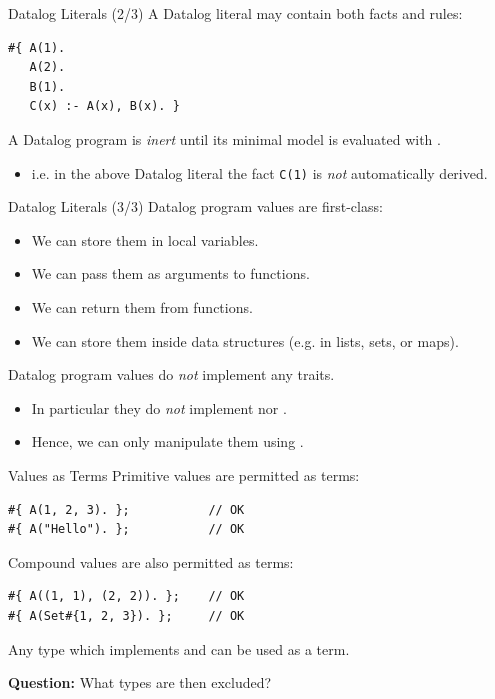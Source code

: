 \begin{frame}[fragile]{Datalog Literals (2/3)}
A Datalog literal may contain both facts and rules:

\begin{lstlisting}[language=flix, xleftmargin=0.8cm]
#{ A(1). 
   A(2). 
   B(1).
   C(x) :- A(x), B(x). }
\end{lstlisting}

A Datalog program is \emph{inert} until its minimal model is evaluated with
. 

\begin{itemize}
    \item i.e. in the above Datalog literal the fact \lstinline{C(1)} is
    \emph{not} automatically derived. 
\end{itemize}
\end{frame}

\begin{frame}[fragile]{Datalog Literals (3/3)}
Datalog program values are first-class:

\begin{itemize}
    \item We can store them in local variables.
    \item We can pass them as arguments to functions.
    \item We can return them from functions.
    \item We can store them inside data structures (e.g. in lists, sets, or
    maps).
\end{itemize}

Datalog program values do \emph{not} implement any traits.

\begin{itemize}
    \item In particular they do \emph{not} implement  nor .
    \item Hence, we can only manipulate them using .
\end{itemize}
\end{frame}

\begin{frame}[fragile]{Values as Terms}
Primitive values are permitted as terms:

\begin{lstlisting}[language=flix, xleftmargin=0.8cm]
#{ A(1, 2, 3). };           // OK
#{ A("Hello"). };           // OK
\end{lstlisting}

Compound values are also permitted as terms:

\begin{lstlisting}[language=flix, xleftmargin=0.8cm]
#{ A((1, 1), (2, 2)). };    // OK
#{ A(Set#{1, 2, 3}). };     // OK
\end{lstlisting}

Any type which implements  and  can be used as a
term.

\textbf{Question:} What types are then excluded?
\end{frame}

